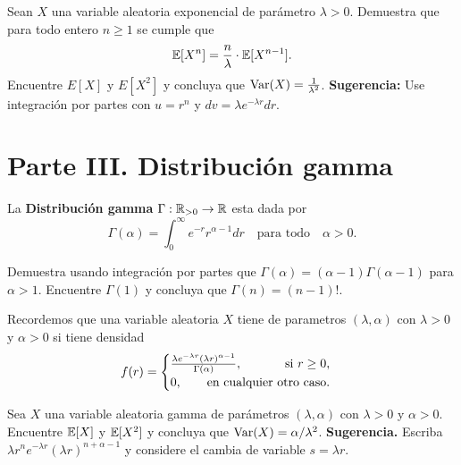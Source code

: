 \documentclass[12pt,a4paper]{article}
\begin{document}
    \begin{mdframed}[style=mdpinkbox,frametitle={Ejercicio 3}]
        Sean $X$ una variable aleatoria exponencial de parámetro $\lambda\gt0$. Demuestra que para todo entero $n\geq1$ se cumple que
        \begin{equation*}
            \mathbb{E}[X^{n}]=\frac{n}{\lambda}\cdot\mathbb{E}[X^{n-1}].
        \end{equation*}
        Encuentre $E[X]$ y $E[X^{2}]$ y concluya que $\operatorname{Var}(X)=\frac{1}{\lambda^{2}}$. \textbf{Sugerencia:} Use integración por partes
        con $u=r^{n}$ y $dv=\lambda e^{-\lambda r}dr$.
    \end{mdframed}

    \section*{Parte III. Distribución gamma}

    La \textbf{Distribución gamma} $\Gamma:\mathbb{R}_{>0}\to\mathbb{R}$ esta dada por
    \begin{equation*}
        \Gamma(\alpha)=\int_{0}^{\infty}e^{-r}r^{\alpha-1}dr\quad\text{para todo}\quad\alpha\gt0.
    \end{equation*}

    \begin{mdframed}[style=mdpinkbox,frametitle={Ejercicio 4}]
        Demuestra usando integración por partes que $\Gamma(\alpha)=(\alpha-1)\Gamma(\alpha-1)$ para $\alpha\gt1$. Encuentre
        $\Gamma(1)$ y concluya que $\Gamma(n)=(n-1)!$.
    \end{mdframed}

    Recordemos que una variable aleatoria $X$ tiene  de parametros $(\lambda,\alpha)$ con $\lambda\gt0$
    y $\alpha\gt0$ si tiene densidad
    \begin{equation*}
        f(r)=
        \begin{cases}
            \frac{\lambda e^{-\lambda r}(\lambda r)^{\alpha-1}}{\Gamma(\alpha)},\hfill\text{si } r\geq0,\\
            0,\qquad\text{en cualquier otro caso}.
        \end{cases}
    \end{equation*}

    \begin{mdframed}[style=mdpinkbox,frametitle={Ejercicio 5}]
        Sea $X$ una variable aleatoria gamma de parámetros $(\lambda,\alpha)$ con $\lambda\gt0$ y $\alpha\gt0$. Encuentre
        $\mathbb{E}[X]$ y $\mathbb{E}[X^{2}]$ y concluya que $\operatorname{Var}(X)=\alpha/\lambda^{2}$. \textbf{Sugerencia.} Escriba $\lambda r^{n}e^{-\lambda r}(\lambda r)^{n+\alpha-1}$
        y considere el cambia de variable $s=\lambda r$.
    \end{mdframed}
\end{document}
